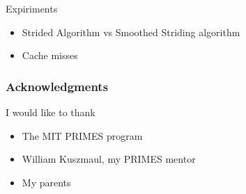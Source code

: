 \documentclass{beamer}
\begin{document}
\begin{frame}[t]{Expiriments}
	\begin{itemize}
		\item Strided Algorithm vs Smoothed Striding algorithm
		\item Cache misses 
	\end{itemize}
\end{frame}

\begin{frame}[t]
\frametitle{Acknowledgments}
I would like to thank
\begin{itemize}
	\item {The MIT PRIMES program}
	\item {William Kuszmaul, my PRIMES mentor}
	\item {My parents}
\end{itemize}
\end{frame}
\end{document}
